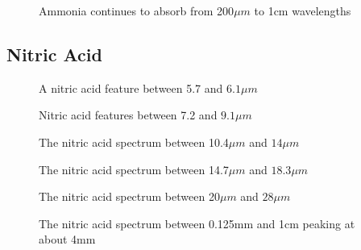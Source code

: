 \documentclass[12pt]{article}
\begin{document}
\vspace*{11.5cm}
\begin{figure}[htb]
\caption{Ammonia continues to absorb from 200$\mu m$ to 1cm wavelengths}
\end{figure}
\newpage


\subsection{Nitric Acid}

\vspace*{11.5cm}
\begin{figure}[htb]
\caption{A nitric acid feature between 5.7 and $6.1 \mu m$}
\end{figure}
\newpage

\vspace*{11.5cm}
\begin{figure}[htb]
\caption{Nitric acid features between 7.2 and $9.1 \mu m$}
\end{figure}
\newpage

\vspace*{11.5cm}
\begin{figure}[htb]
\caption{The nitric acid spectrum between  10.4$\mu m$  and $14 \mu m$}
\end{figure}
\newpage



\vspace*{11.5cm}
\begin{figure}[htb]
\caption{The nitric acid spectrum between  14.7$\mu m$  and $18.3\mu m$}
\end{figure}
\newpage


\vspace*{11.5cm}
\begin{figure}[htb]
\caption{The nitric acid spectrum between  20$\mu m$  and $28\mu m$}
\end{figure}
\newpage


\vspace*{11.5cm}
\begin{figure}[htb]
\caption{The nitric acid spectrum between  0.125mm  and 1cm peaking at about 4mm}
\end{figure}
\newpage
\end{document}
